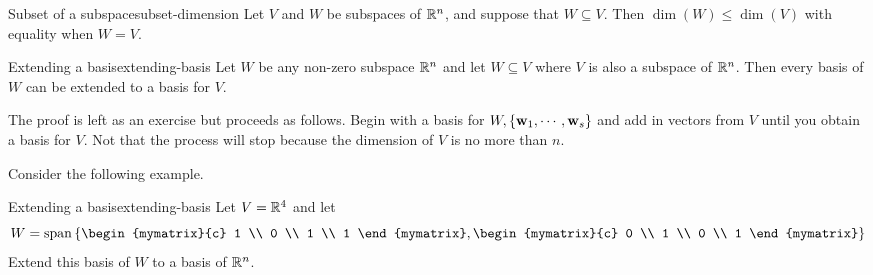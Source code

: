 \begin{theorem}{Subset of a subspace}{subset-dimension}
  Let $V$ and $W$ be subspaces of $\mathbb{R}^n$, and suppose that
  $W\subseteq V$.  Then $\dim(W) \leq \dim(V)$ with equality when
  $W=V$.
\end{theorem}

\begin{theorem}{Extending a basis}{extending-basis}
  Let $W$ be any non-zero subspace $\mathbb{R}^{n}$ and let $W\subseteq V$
  where $V$ is also a subspace of $\mathbb{R}^{n}$. Then every basis of $W$
  can be extended to a basis for $V$.
\end{theorem}

The proof is left as an exercise but proceeds as follows. Begin with a
basis for $W,\left\{\mbox{\bf w}_{1},\cdots ,\mbox{\bf w}_{s}\right\} $ and add in
vectors from $V$ until you obtain a basis for $V$.  Not that the
process will stop because the dimension of $V$ is no more than $n$.

Consider the following example.

\begin{example}{Extending a basis}{extending-basis}
  Let $V=\mathbb{R}^{4}$ and let 
  \begin{equation*}
    W=\sspan\set{
      \begin{mymatrix}{c} 1 \\ 0 \\ 1 \\ 1 \end{mymatrix},
      \begin{mymatrix}{c} 0 \\ 1 \\ 0 \\ 1 \end{mymatrix}
    }
  \end{equation*}
  Extend this basis of $W$ to a basis of $\mathbb{R}^{n}$.
\end{example}

